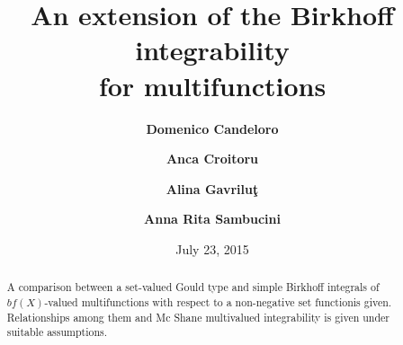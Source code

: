 \documentclass[11pt,a4paper,twoside]{amsart}
\begin{document}
\title[An extension of the Birkhoff  integrability ...]{An extension of the Birkhoff  integrability\\ for multifunctions}

\author[Candeloro]{\bf Domenico Candeloro}
\address{Department of Mathematics and Computer Sciences \\ University of Perugia\\
Via Vanvitelli, 1 - 06123 Perugia (Italy)}

\author[Croitoru]{\bf Anca Croitoru}
\address{\rm Faculty of Mathematics,\\ ''Al.I. Cuza'' University\\ Bd. Carol I, no 11, Ia\c{s}i, 700506, 
(Rom\^{a}nia)}

\author[Gavrilu\c{t}]{\bf Alina Gavrilu\c{t}}
\address{\rm Faculty of Mathematics,\\ ''Al.I. Cuza'' University \\ Bd. Carol I, no 11, Ia\c{s}i, 700506, 
(Rom\^{a}nia)}

\author[Sambucini]{\bf Anna  Rita Sambucini}
\address{\rm Department of Mathematics and Computer Sciences \\ University of Perugia\\
Via Vanvitelli, 1 - 06123 Perugia (Italy)}

\date{July 23, 2015}

\begin{abstract} 
A comparison between  a set-valued Gould type and simple Birkhoff integrals of $bf(X)$-valued multifunctions
with respect to a non-negative set functionis given. Relationships among them and 
 Mc Shane multivalued integrability is given under suitable assumptions.
\end{abstract}
\maketitle
\end{document}

